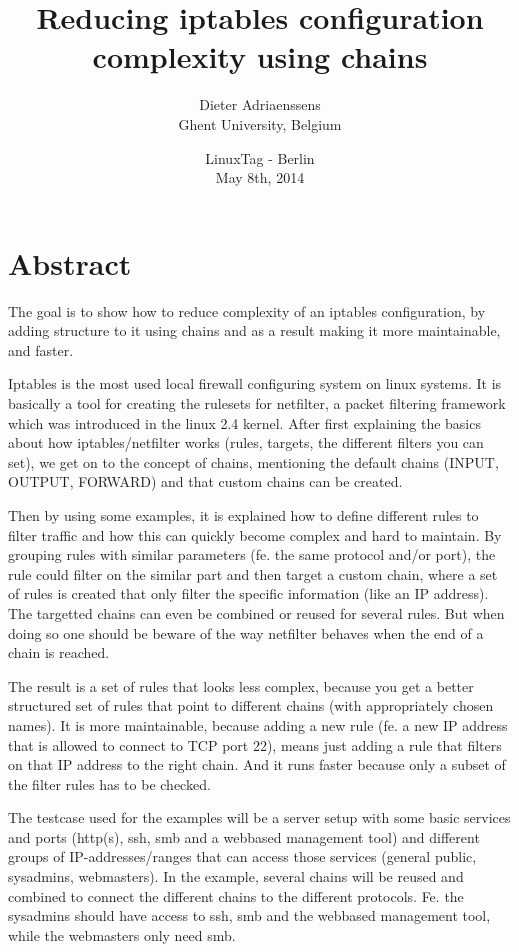 \documentclass[a4paper,12pt]{article}
\begin{document}
\title{Reducing iptables configuration complexity using chains}
\author{Dieter Adriaenssens\\
Ghent University, Belgium}
\date{LinuxTag - Berlin\\
May 8th, 2014}
\maketitle

\pagebreak
\section{Abstract}

The goal is to show how to reduce complexity of an iptables configuration, by adding structure to it using chains and as a result making it more maintainable, and faster.

Iptables is the most used local firewall configuring system on linux systems. It is basically a tool for creating the rulesets for netfilter, a packet filtering framework which was introduced in the linux 2.4 kernel. After first explaining the basics about how iptables/netfilter works (rules, targets, the different filters you can set), we get on to the concept of chains, mentioning the default chains (INPUT, OUTPUT, FORWARD) and that custom chains can be created.

Then by using some examples, it is explained how to define different rules to filter traffic and how this can quickly become complex and hard to maintain. By grouping rules with similar parameters (fe. the same protocol and/or port), the rule could filter on the similar part and then target a custom chain, where a set of rules is created that only filter the specific information (like an IP address). The targetted chains can even be combined or reused for several rules. But when doing so one should be beware of the way netfilter behaves when the end of a chain is reached.

The result is a set of rules that looks less complex, because you get a better structured set of rules that point to different chains (with appropriately chosen names). It is more maintainable, because adding a new rule (fe. a new IP address that is allowed to connect to TCP port 22), means just adding a rule that filters on that IP address to the right chain. And it runs faster because only a subset of the filter rules has to be checked.

The testcase used for the examples will be a server setup with some basic services and ports (http(s), ssh, smb and a webbased management tool) and different groups of IP-addresses/ranges that can access those services (general public, sysadmins, webmasters). In the example, several chains will be reused and combined to connect the different chains to the different protocols. Fe. the sysadmins should have access to ssh, smb and the webbased management tool, while the webmasters only need smb.
\end{document}
